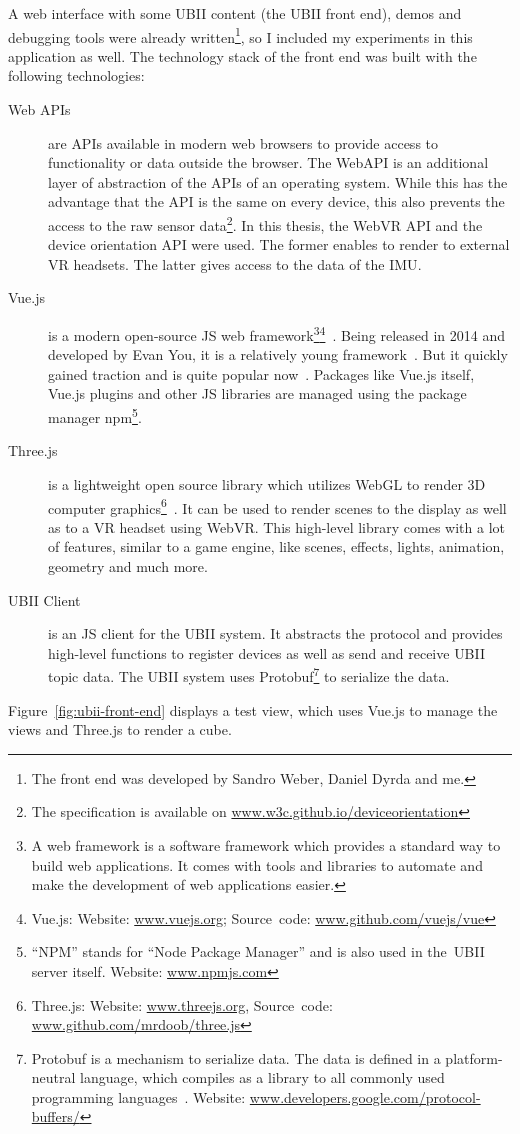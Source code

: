 A web interface with some \ac{UBII} content (the \ac{UBII} front end), demos and debugging tools were already written\footnote{The front end was developed by Sandro Weber, Daniel Dyrda and me.}, so I included my experiments in this application as well. The technology stack of the front end was built with the following technologies:
\begin{description}
  \item[Web APIs] are \acfp{API} available in modern web browsers to provide access to functionality or data outside the browser. The WebAPI is an additional layer of abstraction of the \acp{API} of an operating system. While this has the advantage that the API is the same on every device, this also prevents the access to the raw sensor data\footnote{The specification is available on \href{https://w3c.github.io/deviceorientation/}{www.w3c.github.io/deviceorientation}}. In this thesis, the WebVR \ac{API} and the device orientation \ac{API} were used. The former enables to render to external \ac{VR} headsets. The latter gives access to the data of the \acf{IMU}.
  \item[Vue.js] is a modern open-source \acl{JS} web framework\footnote{A web framework is a software framework which provides a standard way to build web applications. It comes with tools and libraries to automate and make the development of web applications easier.}\footnote{Vue.js: Website: \href{https://vuejs.org/}{www.vuejs.org}; Source~code: \href{https://github.com/vuejs/vue}{www.github.com/vuejs/vue}}~\cite{You.2019}. Being released in 2014 and developed by Evan You, it is a relatively young framework~\cite[17]{Koetsier.2016}. But it quickly gained traction and is quite popular now~\cite[12\psq]{Koetsier.2016}.
  Packages like Vue.js itself, Vue.js plugins and other \acl{JS} libraries are managed using the package manager npm\footnote{\enquote{NPM} stands for \enquote{Node Package Manager} and is also used in the~\ac{UBII} server itself. Website: \href{https://www.npmjs.com/}{www.npmjs.com}}.
  \item[Three.js] is a lightweight open source library which utilizes WebGL to render \ac{3D} computer graphics\footnote{Three.js: Website: \href{https://threejs.org/}{www.threejs.org}, Source~code: \href{https://github.com/mrdoob/three.js/}{www.github.com/mrdoob/three.js}}~\cite{Cabello.2019}. It can be used to render scenes to the display as well as to a VR headset using WebVR. This high-level library comes with a lot of features, similar to a game engine, like scenes, effects, lights, animation, geometry and much more.
  \item[UBII Client] is an \acl{JS} client for the \ac{UBII} system. It abstracts the protocol and provides high-level functions to register devices as well as send and receive \ac{UBII} topic data. The UBII system uses \acf{Protobuf}\footnote{Protobuf is a mechanism to serialize data. The data is defined in a platform-neutral language, which compiles as a library to all commonly used programming languages~\cite{GoogleLLC.2019b}. Website: \href{https://developers.google.com/protocol-buffers/}{www.developers.google.com/protocol-buffers/}} to serialize the data.
\end{description}

Figure~\ref{fig:ubii-front-end} displays a test view, which uses Vue.js to manage the views and Three.js to render a cube.